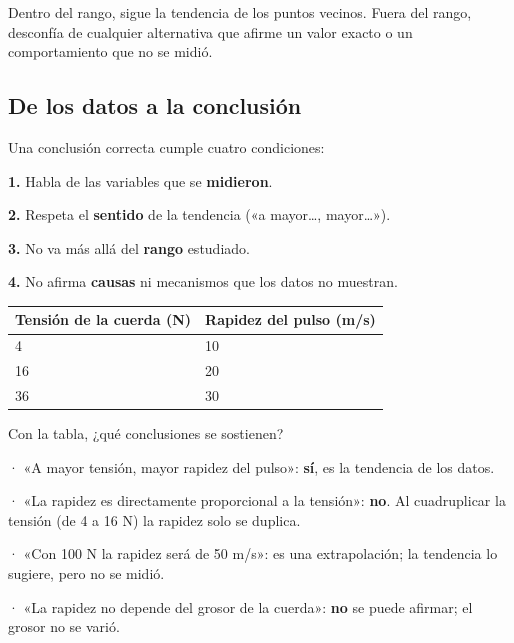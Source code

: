 \begin{clave}[{Recuerda}] Dentro del rango, sigue la tendencia de los puntos vecinos. Fuera del rango, desconfía de cualquier alternativa que afirme un valor exacto o un comportamiento que no se midió.\end{clave}
\subsection{De los datos a la conclusión}
Una conclusión correcta cumple cuatro condiciones:

 

\textbf{1.} Habla de las variables que se \textbf{midieron}.

 

\textbf{2.} Respeta el \textbf{sentido} de la tendencia («a mayor\dots{}, mayor\dots{}»).

 

\textbf{3.} No va más allá del \textbf{rango} estudiado.

 

\textbf{4.} No afirma \textbf{causas} ni mecanismos que los datos no muestran.

 
\begin{center}\small
\begin{tabular}{@{}ll@{}}
\toprule
\textbf{Tensión de la cuerda (N)} & \textbf{Rapidez del pulso (m/s)} \\
\midrule
4 & 10 \\
16 & 20 \\
36 & 30 \\
\bottomrule
\end{tabular}
\end{center}
  
\begin{ejemplo} Con la tabla, ¿qué conclusiones se sostienen?\par · «A mayor tensión, mayor rapidez del pulso»: \textbf{sí}, es la tendencia de los datos.\par · «La rapidez es directamente proporcional a la tensión»: \textbf{no}. Al cuadruplicar la tensión (de 4 a 16 N) la rapidez solo se duplica.\par · «Con 100 N la rapidez será de 50 m/s»: es una extrapolación; la tendencia lo sugiere, pero no se midió.\par · «La rapidez no depende del grosor de la cuerda»: \textbf{no} se puede afirmar; el grosor no se varió.\end{ejemplo}
 

